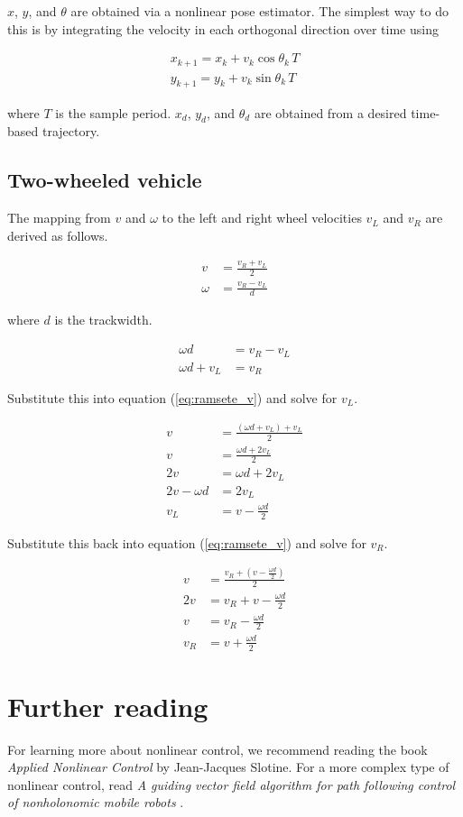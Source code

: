 $x$, $y$, and $\theta$ are obtained via a nonlinear \gls{pose} estimator. The
simplest way to do this is by integrating the velocity in each orthogonal
direction over time using

\begin{align*}
  x_{k+1} = x_k + v_k\cos\theta_k\,T \\
  y_{k+1} = y_k + v_k\sin\theta_k\,T
\end{align*}

where $T$ is the sample period. $x_d$, $y_d$, and $\theta_d$ are obtained from a
desired time-based trajectory.

\subsection{Two-wheeled vehicle}

The mapping from $v$ and $\omega$ to the left and right wheel velocities $v_L$
and $v_R$ are derived as follows.

\begin{align}
  v &= \frac{v_R + v_L}{2} \label{eq:ramsete_v} \\
  \omega &= \frac{v_R - v_L}{d} \label{eq:ramsete_w}
\end{align}

where $d$ is the trackwidth.

\begin{align*}
  \omega d &= v_R - v_L \\
  \omega d + v_L &= v_R
\end{align*}

Substitute this into equation (\ref{eq:ramsete_v}) and solve for $v_L$.

\begin{align}
  v &= \frac{(\omega d + v_L) + v_L}{2} \nonumber \\
  v &= \frac{\omega d + 2v_L}{2} \nonumber \\
  2v &= \omega d + 2v_L \nonumber \\
  2v - \omega d &= 2v_L \nonumber \\
  v_L &= v - \frac{\omega d}{2}
\end{align}

Substitute this back into equation (\ref{eq:ramsete_v}) and solve for $v_R$.

\begin{align}
  v &= \frac{v_R + (v - \frac{\omega d}{2})}{2} \nonumber \\
  2v &= v_R + v - \frac{\omega d}{2} \nonumber \\
  v &= v_R - \frac{\omega d}{2} \nonumber \\
  v_R &= v + \frac{\omega d}{2}
\end{align}

\section{Further reading}

For learning more about nonlinear control, we recommend reading the book
\textit{Applied Nonlinear Control} by Jean-Jacques Slotine. For a more complex
type of nonlinear control, read \textit{A guiding vector field algorithm for
path following control of nonholonomic mobile robots} \cite{bib:gvf}.
